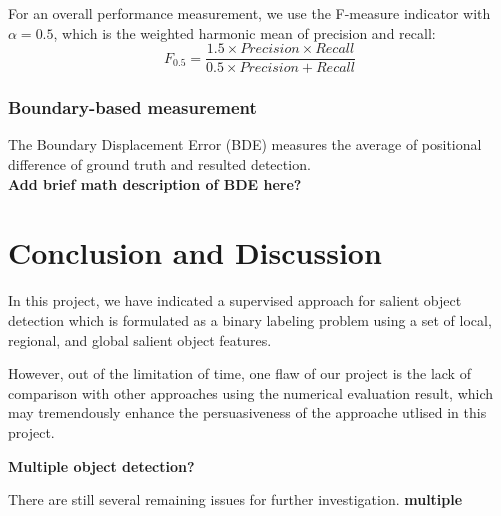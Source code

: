 \documentclass[10pt,twocolumn,letterpaper]{article}
\newcommand{\BOLD}{\textbf}
\begin{document}
For an overall performance measurement, we use the F-measure indicator with $\alpha = 0.5$, which is the weighted 
harmonic mean of precision and recall:
$$
    F_{0.5} = \frac{1.5\times Precision \times Recall}{ 0.5 \times Precision + Recall}
$$

\subsubsection{Boundary-based measurement}
The Boundary Displacement Error (BDE) measures the average of positional difference 
of ground truth and resulted detection. \\
\BOLD{Add brief math description of BDE here?}

\section{Conclusion and Discussion}
In this project, we have indicated a supervised approach for salient object detection 
which is formulated as a binary labeling problem using a set of local, regional,
and global salient object features.

However, out of the limitation of time, one flaw of our project is the lack of comparison
with other approaches using the numerical evaluation result, which may tremendously 
enhance the persuasiveness of the approache utlised in this project. 

\BOLD{Multiple object detection?}

There are still several remaining issues for further investigation. 
\BOLD{multiple }
\end{document}
